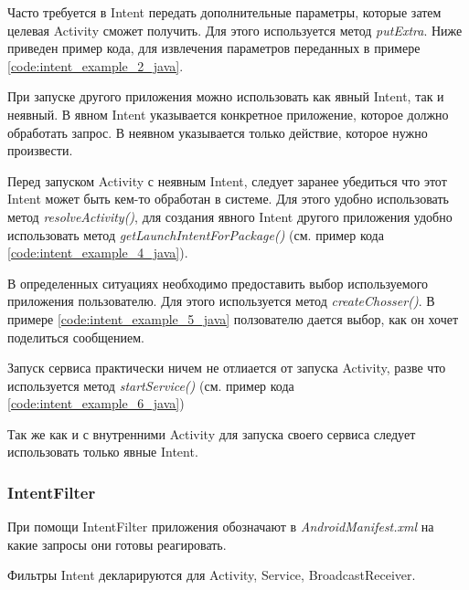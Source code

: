 Часто требуется в Intent передать дополнительные параметры, которые затем целевая Activity сможет получить. Для этого используется метод \textit{putExtra}. Ниже приведен пример кода, для извлечения параметров переданных в примере \ref{code:intent_example_2_java}.
	
	
При запуске другого приложения можно использовать как явный Intent, так и неявный. В явном Intent указывается конкретное приложение, которое должно обработать запрос. В неявном указывается только действие, которое нужно произвести.
	

Перед запуском Activity с неявным Intent, следует заранее убедиться что этот Intent может быть кем-то обработан в системе. Для этого удобно использовать метод \textit{resolveActivity()}, для создания явного Intent другого приложения удобно использовать метод \textit{getLaunchIntentForPackage()} (см. пример кода \ref{code:intent_example_4_java}).

В определенных ситуациях необходимо предоставить выбор используемого приложения пользователю. Для этого используется метод \textit{createChosser()}. В примере \ref{code:intent_example_5_java} ползователю дается выбор, как он хочет поделиться сообщением.
	

Запуск сервиса практически ничем не отлиается от запуска Activity, разве что используется метод \textit{startService()} (см. пример кода \ref{code:intent_example_6_java})
	
	
Так же как и с внутренними Activity для запуска своего сервиса следует использовать только явные Intent. 


\subsubsection{IntentFilter}
При помощи IntentFilter приложения обозначают в \textit{AndroidManifest.xml} на какие запросы они готовы реагировать.

Фильтры Intent декларируются для Activity, Service, BroadcastReceiver.